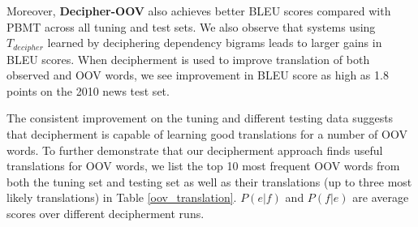 Moreover, \textbf{Decipher-OOV} also achieves better BLEU scores compared with PBMT across all tuning and test sets. We also observe that systems using $T_{decipher}$ learned by deciphering dependency bigrams leads to larger gains in BLEU scores. When decipherment is used to improve translation of both observed and OOV words, we see improvement in BLEU score as high as 1.8 points on the 2010 news test set.

The consistent improvement on the tuning and different testing data suggests that decipherment is capable of learning good translations for a number of OOV words. To further demonstrate that our decipherment approach finds useful translations for OOV words, we list the top 10 most frequent OOV words from both the tuning set and testing set as well as their translations (up to three most likely translations) in Table \ref{oov_translation}. $P(e|f)$ and $P(f|e)$ are average scores over different decipherment runs.

